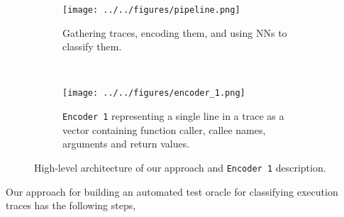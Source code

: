 \begin{figure*}[t]
    \centering
    \begin{subfigure}[b]{0.5\textwidth}
        \texttt{[image: ../../figures/pipeline.png]} %
    \caption{Gathering traces, encoding them, and using NNs to classify them.}
        \label{fig:pipeline}
    \end{subfigure}~~
    \centering
    \begin{subfigure}[b]{0.5\textwidth}
        \texttt{[image: ../../figures/encoder\_1.png]} %
        \caption{\texttt{Encoder 1} representing a single line in a trace as a vector containing function caller, callee names, arguments and return values. }
        \label{fig:encoder-1}
    \end{subfigure}
 \vspace{-10pt}
 \caption{High-level architecture of our approach and \texttt{Encoder 1} description.}
    \vspace{-4pt}
\end{figure*}
\iffalse
\begin{figure}[ht!]
    \centering
    \texttt{[image: ../figures/encoder\_2.png]}
    \caption{\texttt{Encoder 2} representing a sequence of trace lines and global state as a single vector.}
    \label{fig:encoder-2}
    \vspace{-10pt}
\end{figure}
\fi
\iffalse
\begin{figure}[ht!]
	\centering
	\texttt{[image: ../figures/mutation.png]}
	\caption{Labelling test executions by matching actual and expected behavior.}
	\label{fig:labelling}
	\vspace{-10pt}
\end{figure}
\fi
Our approach for building an automated test oracle for classifying execution traces has the following steps,
